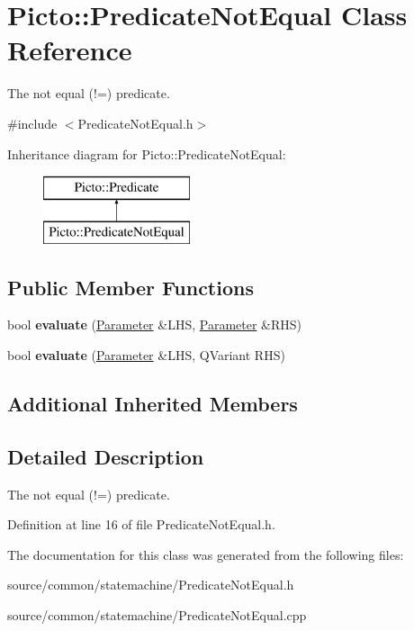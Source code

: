 \hypertarget{class_picto_1_1_predicate_not_equal}{\section{Picto\-:\-:Predicate\-Not\-Equal Class Reference}
\label{class_picto_1_1_predicate_not_equal}
}


The not equal (!=) predicate.  




{\ttfamily \#include $<$Predicate\-Not\-Equal.\-h$>$}

Inheritance diagram for Picto\-:\-:Predicate\-Not\-Equal\-:\begin{figure}[H]
\begin{center}
\leavevmode
\includegraphics[height=2.000000cm]{class_picto_1_1_predicate_not_equal}
\end{center}
\end{figure}
\subsection*{Public Member Functions}
\begin{DoxyCompactItemize}
\item 
\hypertarget{class_picto_1_1_predicate_not_equal_a2c6760993eeceaab0c02a21ce81ea09b}{bool {\bfseries evaluate} (\hyperlink{class_picto_1_1_parameter}{Parameter} \&L\-H\-S, \hyperlink{class_picto_1_1_parameter}{Parameter} \&R\-H\-S)}\label{class_picto_1_1_predicate_not_equal_a2c6760993eeceaab0c02a21ce81ea09b}

\item 
\hypertarget{class_picto_1_1_predicate_not_equal_accb3acaf5acf9b692bf29d11e387798c}{bool {\bfseries evaluate} (\hyperlink{class_picto_1_1_parameter}{Parameter} \&L\-H\-S, Q\-Variant R\-H\-S)}\label{class_picto_1_1_predicate_not_equal_accb3acaf5acf9b692bf29d11e387798c}

\end{DoxyCompactItemize}
\subsection*{Additional Inherited Members}


\subsection{Detailed Description}
The not equal (!=) predicate. 

Definition at line 16 of file Predicate\-Not\-Equal.\-h.



The documentation for this class was generated from the following files\-:\begin{DoxyCompactItemize}
\item 
source/common/statemachine/Predicate\-Not\-Equal.\-h\item 
source/common/statemachine/Predicate\-Not\-Equal.\-cpp\end{DoxyCompactItemize}
